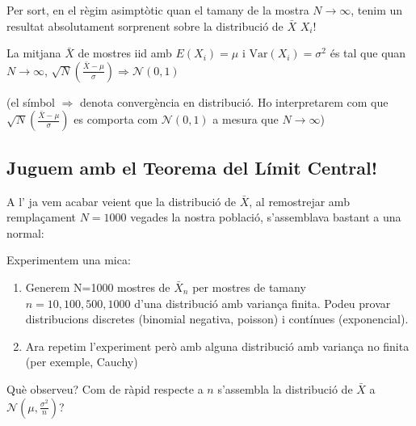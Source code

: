 \documentclass[letterpaper,10pt,english]{sphinxmanual}
\let\sphinxpxdimen\pdfpxdimen\else\newdimen\sphinxpxdimen
\begin{document}
Per sort, en el règim asimptòtic quan el tamany de la mostra \(N \to \infty\),
tenim un resultat absolutament sorprenent sobre la distribució de \(\bar{X}\)
\(X_i\)!

 La mitjana \(\bar{X}\) de mostres iid
amb \(E(X_i) =\mu\) i \(\mbox{Var}(X_i)=\sigma^2\) és tal que quan \(N \to \infty\),
\(\sqrt{N}\left(\frac{\bar{X} - \mu}{\sigma}\right) \Rightarrow \mathcal{N}(0, 1)\)

(el símbol \(\Rightarrow\) denota convergència en distribució. Ho interpretarem
com que \(\sqrt{N}\left(\frac{\bar{X} - \mu}{\sigma}\right)\) es comporta com \(\mathcal{N}(0, 1)\)
a mesura que \(N \to \infty\))


\subsection{Juguem amb el Teorema del Límit Central!}
\label{\detokenize{0_Intro/0_2_Intro_stats:juguem-amb-el-teorema-del-limit-central}}
A l’
ja vem acabar veient que la distribució de \(\bar{X}\), al re\sphinxhyphen{}mostrejar amb remplaçament
\(N=1000\) vegades la nostra població, s’assemblava bastant a una normal:

\begin{figure}[htbp]
\centering

\noindent\sphinxincludegraphics[height=400\sphinxpxdimen]{{clt}.png}
\end{figure}

Experimentem una mica:
\begin{enumerate}
%
\item {} 
Generem N=1000 mostres de \(\bar{X}_n\) per mostres de tamany \(n=10,100,500,1000\) d’una distribució amb variança finita. Podeu provar distribucions discretes (binomial negativa, poisson) i contínues (exponencial).

\item {} 
Ara repetim l’experiment però amb alguna distribució amb variança no finita (per exemple, Cauchy)

\end{enumerate}

Què observeu? Com de ràpid respecte a \(n\) s’assembla la distribució de \(\bar{X}\) a \(\mathcal{N}(\mu, \frac{\sigma^2}{n})\)?
\end{document}
